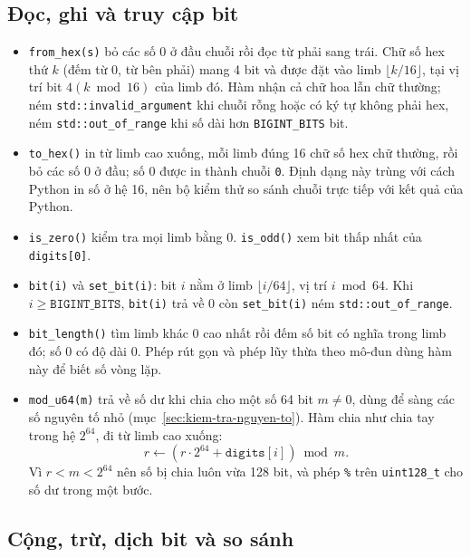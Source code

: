 \subsection{Đọc, ghi và truy cập bit}

\begin{itemize}
    \item \texttt{from\_hex(s)} bỏ các số 0 ở đầu chuỗi rồi đọc từ phải sang trái. Chữ số hex thứ $k$ (đếm từ 0, từ bên phải) mang 4 bit và được đặt vào limb $\lfloor k/16 \rfloor$, tại vị trí bit $4 (k \bmod 16)$ của limb đó. Hàm nhận cả chữ hoa lẫn chữ thường; ném \texttt{std::invalid\_argument} khi chuỗi rỗng hoặc có ký tự không phải hex, ném \texttt{std::out\_of\_range} khi số dài hơn \texttt{BIGINT\_BITS} bit.
    \item \texttt{to\_hex()} in từ limb cao xuống, mỗi limb đúng 16 chữ số hex chữ thường, rồi bỏ các số 0 ở đầu; số 0 được in thành chuỗi \texttt{0}. Định dạng này trùng với cách Python in số ở hệ 16, nên bộ kiểm thử so sánh chuỗi trực tiếp với kết quả của Python.
    \item \texttt{is\_zero()} kiểm tra mọi limb bằng 0. \texttt{is\_odd()} xem bit thấp nhất của \texttt{digits[0]}.
    \item \texttt{bit(i)} và \texttt{set\_bit(i)}: bit $i$ nằm ở limb $\lfloor i/64 \rfloor$, vị trí $i \bmod 64$. Khi $i \ge \texttt{BIGINT\_BITS}$, \texttt{bit(i)} trả về 0 còn \texttt{set\_bit(i)} ném \texttt{std::out\_of\_range}.
    \item \texttt{bit\_length()} tìm limb khác 0 cao nhất rồi đếm số bit có nghĩa trong limb đó; số 0 có độ dài 0. Phép rút gọn và phép lũy thừa theo mô-đun dùng hàm này để biết số vòng lặp.
    \item \texttt{mod\_u64(m)} trả về số dư khi chia cho một số 64 bit $m \ne 0$, dùng để sàng các số nguyên tố nhỏ (mục~\ref{sec:kiem-tra-nguyen-to}). Hàm chia như chia tay trong hệ $2^{64}$, đi từ limb cao xuống:
    \begin{equation}
    r \leftarrow \left(r \cdot 2^{64} + \texttt{digits}[i]\right) \bmod m .
    \end{equation}
    Vì $r < m < 2^{64}$ nên số bị chia luôn vừa 128 bit, và phép \texttt{\%} trên \texttt{uint128\_t} cho số dư trong một bước.
\end{itemize}

\subsection{Cộng, trừ, dịch bit và so sánh}

